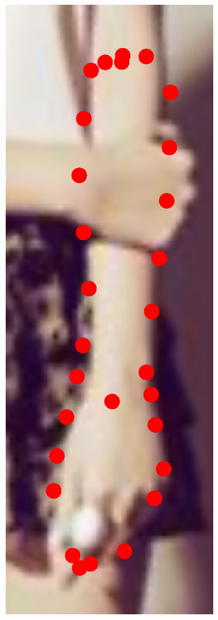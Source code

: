 \begin{figure}[!t]
    \includegraphics[height=\ofh]{resources/Annotation_Correction/Fittings/23.eps}
    \hfill

\end{figure}
